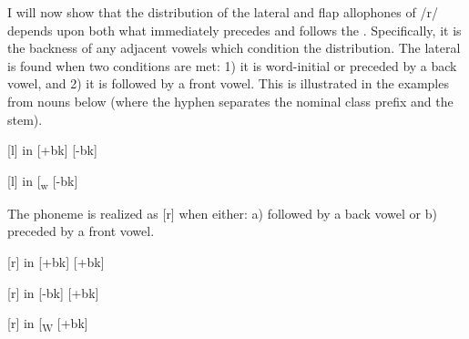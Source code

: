 \documentclass[output=paper
,newtxmath
,modfonts
,nonflat]{langsci/langscibook}
\begin{document}
I will now show that the distribution of the lateral and flap allophones of /r/ depends upon both what immediately precedes and follows the . Specifically, it is the backness of any adjacent vowels which condition the distribution. The lateral is found when two conditions %
%
are met: 1) it is word-initial or preceded by a back vowel, and 2) it is followed by a front vowel. This is illustrated in the examples from nouns below (where the hyphen separates the nominal class prefix and the stem).

\ea\label{ex:bickmore:2}
[l] in  [+bk] \underline{ }\underline{ } [-bk]
\ea\label{ex:bickmore:2a}
\ex\label{ex:bickmore:2b}
\ex\label{ex:bickmore:2c}
\ex\label{ex:bickmore:2d}
\z
\z

\ea\label{ex:bickmore:3}
[l] in  [\textsubscript{w} \underline{ }\underline{ } [-bk]
\z

The  phoneme is realized as [r] when either: a) followed by a back vowel or b) preceded by a front vowel.

\ea\label{ex:bickmore:4}
[r] in  [+bk] \underline{ }\underline{ } [+bk]
\ea\label{ex:bickmore:4a}
\ex\label{ex:bickmore:4b}
\ex\label{ex:bickmore:4c}
\ex\label{ex:bickmore:4d}
\z
\z

\ea\label{ex:bickmore:5}
[r] in  [-bk] \underline{ }\underline{ } [+bk]
\ea\label{ex:bickmore:5a}
\ex\label{ex:bickmore:5b}
\ex\label{ex:bickmore:5c}
\ex\label{ex:bickmore:5d}
\z
\z

\noindent\parbox{\textwidth}{\ea\label{ex:bickmore:6}
[r] in  [\textsubscript{W}%
%
 \underline{ }\underline{ } [+bk]
\ea\label{ex:bickmore:6a}
\ex\label{ex:bickmore:6b}
\ex\label{ex:bickmore:6c}
\z
\z}
\end{document}
